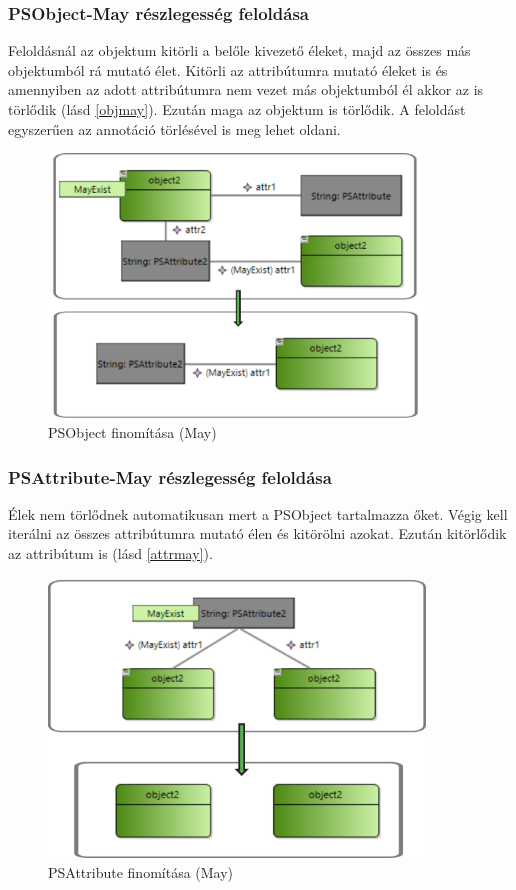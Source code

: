 \subsubsection{PSObject-May részlegesség feloldása}
Feloldásnál az objektum kitörli a belőle kivezető éleket, majd az összes más objektumból rá mutató élet. Kitörli az attribútumra mutató éleket is és amennyiben az adott attribútumra nem vezet más objektumból él akkor az is törlődik (lásd \autoref{objmay}). Ezután maga az objektum is törlődik. A feloldást egyszerűen az annotáció törlésével is meg lehet oldani.
\begin{figure}[!ht]
	\centering
	\includegraphics[width=100mm]{figures/objmay.pdf}
	\caption{PSObject finomítása (May)}
	\label{objmay} 
\end{figure}

\subsubsection{PSAttribute-May részlegesség feloldása}
Élek nem törlődnek automatikusan mert a PSObject tartalmazza őket. Végig kell iterálni az összes attribútumra mutató élen és kitörölni azokat. Ezután kitörlődik az attribútum is (lásd \autoref{attrmay}). 
\begin{figure}[!ht]
	\centering
	\includegraphics[width=100mm]{figures/attrmay.pdf}
	\caption{PSAttribute finomítása (May)}
	\label{attrmay} 
\end{figure}

